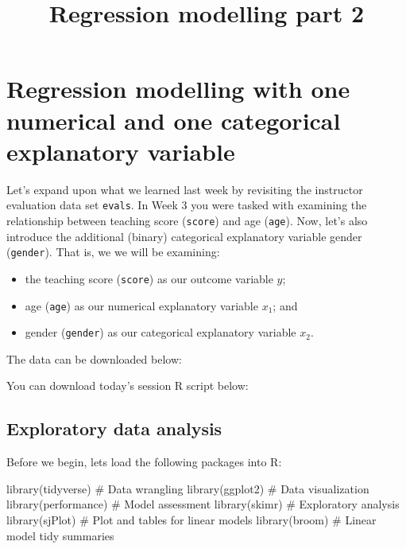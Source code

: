 \documentclass[
  letterpaper,
  DIV=11,
  numbers=noendperiod]{scrartcl}
\title{Regression modelling part 2}
\author{}
\date{}
\makeatletter
\newenvironment{Shaded}{\begin{snugshade}}{\end{snugshade}}
\newcommand{\CommentTok}[1]{\textcolor[rgb]{0.37,0.37,0.37}{#1}}
\newcommand{\FunctionTok}[1]{\textcolor[rgb]{0.28,0.35,0.67}{#1}}
\newcommand{\NormalTok}[1]{\textcolor[rgb]{0.00,0.23,0.31}{#1}}
\providecommand{\tightlist}{%
  \setlength{\itemsep}{0pt}\setlength{\parskip}{0pt}}\usepackage{longtable,booktabs,array}
\renewcommand{\maketitle}{\bgroup\setlength{\parindent}{0pt}
\begin{flushleft}
  {\color{uniblue}\sffamily\huge\textbf{\@title}} \vspace{0.3cm} \newline
  {\Large {\@subtitle}} \newline
  \@author
\end{flushleft}\egroup
}
\makeatother
\begin{document}
\maketitle

\pagestyle{mystyle}

\section{Regression modelling with one numerical and one categorical
explanatory
variable}\label{regression-modelling-with-one-numerical-and-one-categorical-explanatory-variable}

Let's expand upon what we learned last week by revisiting the instructor
evaluation data set \texttt{evals}. In Week 3 you were tasked with
examining the relationship between teaching score (\texttt{score}) and
age (\texttt{age}). Now, let's also introduce the additional (binary)
categorical explanatory variable gender (\texttt{gender}). That is, we
we will be examining:

\begin{itemize}
\tightlist
\item
  the teaching score (\texttt{score}) as our outcome variable \(y\);
\item
  age (\texttt{age}) as our numerical explanatory variable \(x_1\); and
\item
  gender (\texttt{gender}) as our categorical explanatory variable
  \(x_2\).
\end{itemize}

The data can be downloaded below:

You can download today's session R script below:

\subsection{Exploratory data analysis}\label{exploratory-data-analysis}

Before we begin, lets load the following packages into R:

\begin{Shaded}
\begin{Highlighting}[]
\FunctionTok{library}\NormalTok{(tidyverse)    }\CommentTok{\# Data wrangling }
\FunctionTok{library}\NormalTok{(ggplot2)      }\CommentTok{\# Data visualization}
\FunctionTok{library}\NormalTok{(performance)  }\CommentTok{\# Model assessment}
\FunctionTok{library}\NormalTok{(skimr)        }\CommentTok{\# Exploratory analysis}
\FunctionTok{library}\NormalTok{(sjPlot)       }\CommentTok{\# Plot and tables for linear models}
\FunctionTok{library}\NormalTok{(broom)        }\CommentTok{\# Linear model tidy summaries}
\end{Highlighting}
\end{Shaded}
\end{document}

